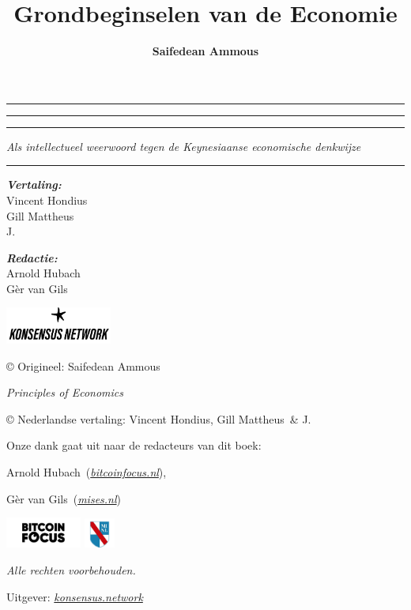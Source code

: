 \documentclass[smalldemyvopaper,11pt,twoside,onecolumn,openright,extrafontsizes]{memoir}
\title{Grondbeginselen van de Economie}
\author{\textbf{Saifedean Ammous}}
\newcommand{\subtitle}{Als intellectueel weerwoord tegen de Keynesiaanse economische denkwijze}
\newcommand{\editor}{Arnold Hubach}
\newcommand{\editortwo}{Gèr van Gils}
\newcommand{\translatorone}{Vincent Hondius}
\newcommand{\translatortwo}{Gill Mattheus}
\newcommand{\translatorthree}{J.}
\newcommand{\translators}{
\textbf{Vertaling:}\\
\translatorone\\
\translatortwo\\
\translatorthree\\
}
\newcommand{\editors}{
\textbf{Redactie:}\\
\editor\\
\editortwo\\
}
\newcommand*\halftitlepage{\begingroup %
  \setlength\drop{0.1\textheight}
  \begin{center}
  \vspace*{\drop}
  \rule{\textwidth}{0in}\par
  {\Large\textsc\thetitle\par}
  \rule{\textwidth}{0in}\par
  \vfill
  \end{center}
\endgroup}
\newlength\drop
\newcommand*\titleM{\begingroup %
  \setlength\drop{0.15\textheight}
  \begin{center}
  \vspace*{\drop}
  \rule{\textwidth}{0in}\par
  {\huge\textsc\thetitle\par}
  \vspace{2em}
  {\large\textit{\subtitle}\par}
  \vspace{2em}
  \rule{5.5cm}{0.3mm}\par
  \vspace{2em}
  {\Large\textit\theauthor\par}
  \vspace{3em}
  {\footnotesize\textit\translators\par}
  \vspace{1em}
  {\footnotesize\textit\editors\par}
  \vfill
  \includegraphics[width=3.5cm]{figures/knw.png}\par
  \end{center}
\endgroup}
\begin{document}


\makeatletter
\renewcommand{\@seccntformat}[1]{}
\makeatother


\frontmatter
\pagestyle{empty}
\halftitlepage
\cleardoublepage
\titleM
\clearpage
\vphantom{just for the drop}
\vfill

\begin{scriptsize}
\noindent \copyright{} Origineel: Saifedean Ammous
\par\noindent \textit{Principles of Economics}

\vspace{0.5\baselineskip}

\noindent \copyright{} Nederlandse vertaling: \translatorone, \translatortwo ~\& \translatorthree
\par\noindent \textit{\thetitle}

\vspace{0.5\baselineskip}
\par\noindent Onze dank gaat uit naar de redacteurs van dit boek:
\vspace{0.25\baselineskip}

\par\noindent \editor~(\href{https://bitcoinfocus.nl}{\textit{bitcoinfocus.nl}}),
\par\noindent \editortwo~(\href{https://mises.nl}{\textit{mises.nl}})

\vspace{0.5\baselineskip}
\includegraphics[width=2.5cm]{figures/bitcoinfocus.png} \hspace{2em} \includegraphics[width=1cm]{figures/misesnl.png}
\vspace{\baselineskip}

\noindent \textit{Alle rechten voorbehouden.}

\vspace{0.5\baselineskip}

\noindent Uitgever: \href{https://konsensus.network}{\textit{konsensus.network}}

\vspace{0.5\baselineskip}


\end{scriptsize}
\end{document}
